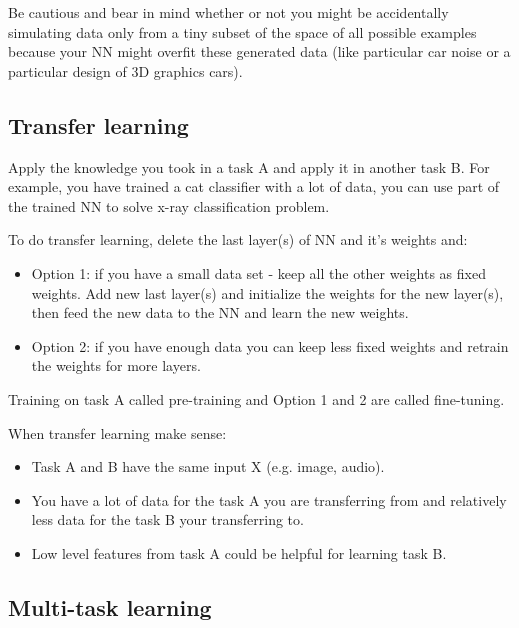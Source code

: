 \documentclass{article}
\begin{document}
\bigskip

\noindent Be cautious and bear in mind whether or not you might be accidentally simulating data only from a tiny subset of the space of all possible examples because your NN might overfit these generated data (like particular car noise or a particular design of 3D graphics cars).

\subsection{Transfer learning}

\noindent Apply the knowledge you took in a task A and apply it in another task B. For example, you have trained a cat classifier with a lot of data, you can use part of the trained NN to solve x-ray classification problem.

\bigskip

\noindent To do transfer learning, delete the last layer(s) of NN and it's weights and:

\begin{itemize}
    \item Option 1: if you have a small data set - keep all the other weights as fixed weights. Add new last layer(s) and initialize the weights for the new layer(s), then feed the new data to the NN and learn the new weights.
    \item Option 2: if you have enough data you can keep less fixed weights and retrain the weights for more layers.
\end{itemize}

\noindent Training on task A called pre-training and Option 1 and 2 are called fine-tuning.

\bigskip

\noindent When transfer learning make sense:

\begin{itemize}
    \item Task A and B have the same input X (e.g. image, audio).
    \item You have a lot of data for the task A you are transferring from and relatively less data for the task B your transferring to.
    \item Low level features from task A could be helpful for learning task B.
\end{itemize}

\subsection{Multi-task learning}
\end{document}
